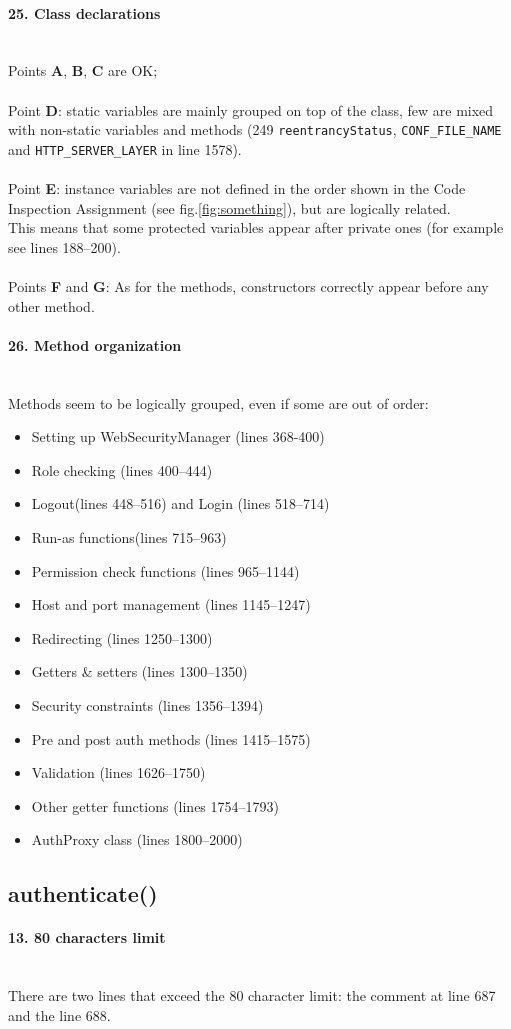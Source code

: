 \documentclass[english]{article}
\newcommand{\code}[1]{\texttt{#1}}
\newcommand{\issue}[3][?]{
    \paragraph{#1. #2} \mbox{}\\ #3
}
\begin{document}
\issue[25]{Class declarations} {
    Points \textbf{A}, \textbf{B}, \textbf{C} are OK; \\ \\
    Point \textbf{D}: static variables are mainly grouped on top of 
    the class, few are mixed with non-static variables and methods 
    (249 \code{reentrancyStatus}, \code{CONF\_FILE\_NAME} and
    \code{HTTP\_SERVER\_LAYER} in line 1578). \\ \\ 
    Point \textbf{E}: instance variables are not 
    defined in the order shown in the Code Inspection Assignment 
    (see fig.\ref{fig:something}), but are logically related. \\
    This means that some protected variables appear after private ones 
    (for example see lines 188--200). \\ \\ 
    Points \textbf{F} and \textbf{G}: As for the methods, constructors correctly appear before any 
    other method.
}

\issue[26]{Method organization} {
Methods seem to be logically grouped, even if some are out of order: 
\begin{itemize}
    \item Setting up WebSecurityManager (lines 368-400)
    \item Role checking (lines 400--444)
    \item Logout(lines 448--516) and Login (lines 518--714)
    \item Run-as functions(lines 715--963)
    \item Permission check functions (lines 965--1144)
    \item Host and port management (lines 1145--1247)
    \item Redirecting (lines 1250--1300)
    \item Getters \& setters (lines 1300--1350)
    \item Security constraints (lines 1356--1394)
    \item Pre and post auth methods (lines 1415--1575)
    \item Validation (lines 1626--1750)
    \item Other getter functions (lines 1754--1793)
    \item AuthProxy class (lines 1800--2000) 
\end{itemize}
}

\subsection{authenticate()} %
\issue[13]{80 characters limit}{
    There are two lines that exceed the 80 character limit: the comment
    at line 687 and the line 688. 
}
\end{document}

